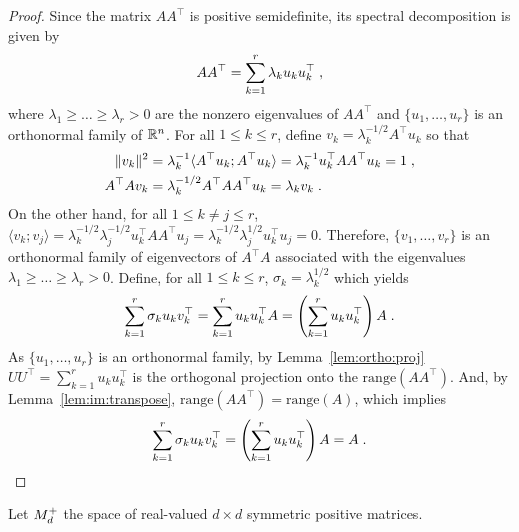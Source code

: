 \begin{proof}
Since the matrix $AA^\top$ is positive semidefinite, its spectral decomposition is given by
\[
AA^\top = \sum_{k=1}^r \lambda_k u_k u^\top_k\;,
\]
where $\lambda_1\geqslant \ldots\geqslant \lambda_r>0$ are the nonzero eigenvalues of $AA^\top$ and $\{u_1,\ldots,u_r\}$ is an orthonormal family of $\mathbb{R}^n$. For all $1\leqslant k\leqslant r$, define $v_k = \lambda_k^{-1/2}A^\top u_k$ so that
\begin{align*}
\|v_k\|^2&=\lambda_k^{-1}\langle A^\top u_k;A^\top u_k\rangle = \lambda_k^{-1} u^\top_kAA^\top u_k = 1\;, \\
A^\top Av_k & = \lambda_k^{-1/2}A^\top A A^\top u_k  = \lambda_k v_k\;.
\end{align*}
On the other hand, for all $1\leqslant k\neq j\leqslant r$, $\langle v_k;v_j\rangle = \lambda_k^{-1/2}\lambda_j^{-1/2}u^\top_kA A^\top u_j =\lambda_k^{-1/2}\lambda_j^{1/2}u^\top_ku_j = 0$. Therefore, $\{v_1,\ldots,v_r\}$ is an orthonormal family of eigenvectors of $A^\top A$ associated with the eigenvalues $\lambda_1\geqslant \ldots\geqslant \lambda_r>0$. 
Define, for all $1\leqslant k\leqslant r$, $\sigma_k = \lambda_k^{1/2}$ which yields
\[
\sum_{k=1}^r \sigma_k u_k v^\top_k = \sum_{k=1}^r  u_k u^\top_kA = \left(\sum_{k=1}^r  u_k u^\top_k\right)A\;.
\]
As $\{u_1,\ldots,u_r\}$ is an orthonormal family, by Lemma~\ref{lem:ortho:proj}$UU^\top = \sum_{k=1}^r u_ku^\top_k$ is the orthogonal projection onto the $\mathrm{range}(AA^\top)$. And, by Lemma~\ref{lem:im:transpose},  $\mathrm{range}(AA^\top)= \mathrm{range}(A)$, which implies
\[
\sum_{k=1}^r \sigma_k u_k v^\top_k = \left(\sum_{k=1}^r  u_k u^\top_k\right)A = A\;.
\]
\end{proof}

\noindent Let $M^+_{d}$ the space of real-valued $d \times d$ symmetric positive matrices.

